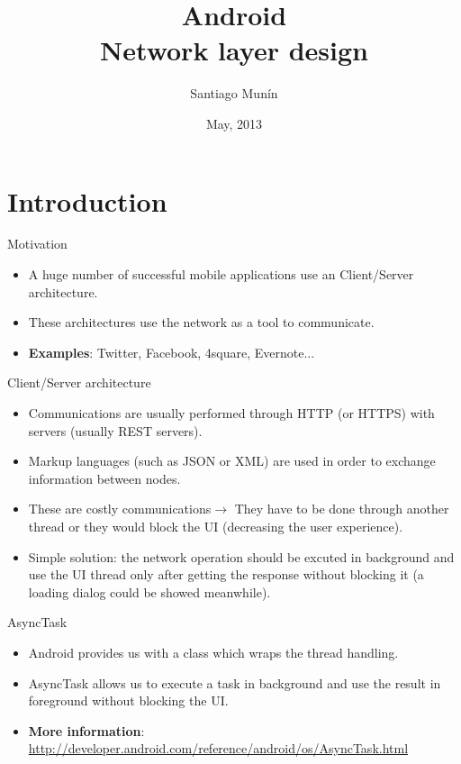 \documentclass{beamer}
\title[Network layer design in Android]{Android\\Network layer design}
\author{Santiago Munín}
\institute{Universidade da Coruña}
\date{May, 2013}
\begin{document}
\begin{frame}
\titlepage
\end{frame}

\section{Introduction}
\begin{frame}{Motivation}
\begin{itemize}
\item A huge number of successful mobile applications use an Client/Server architecture.
\item These architectures use the network as a tool to communicate.
\item {\bf Examples}: Twitter, Facebook, 4square, Evernote...
\end{itemize}
\end{frame}

\begin{frame}{Client/Server architecture}
\begin{itemize}
\item Communications are usually performed through HTTP (or HTTPS) with servers (usually REST servers).
\item Markup languages (such as JSON or XML) are used in order to exchange information between nodes.
\item These are costly communications$\rightarrow$ They have to be done through another thread or they would block the UI (decreasing the user experience).
\item Simple solution: the network operation should be excuted in background and use the UI thread only after getting the response without blocking it (a loading dialog could be showed meanwhile).
\end{itemize}
\end{frame}

\begin{frame}{AsyncTask}
\begin{itemize}
\item Android provides us with a class which wraps the thread handling.
\item AsyncTask allows us to execute a task in background and use the result in foreground without blocking the UI.
\item {\bf More information}: \url{http://developer.android.com/reference/android/os/AsyncTask.html}
\end{itemize}
\end{frame}
\end{document}
